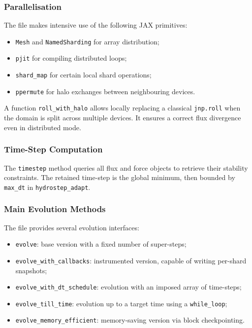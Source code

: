 \documentclass[a4paper, 11pt]{article}
\begin{document}
\subsubsection*{Parallelisation}
The file makes intensive use of the following JAX primitives:
\begin{itemize}
    \item \texttt{Mesh} and \texttt{NamedSharding} for array distribution;
    \item \texttt{pjit} for compiling distributed loops;
    \item \texttt{shard\_map} for certain local shard operations;
    \item \texttt{ppermute} for halo exchanges between neighbouring devices.
\end{itemize}

A function \texttt{roll\_with\_halo} allows locally replacing a classical \texttt{jnp.roll} when the domain is split across multiple devices. It ensures a correct flux divergence even in distributed mode.

\subsubsection*{Time-Step Computation}
The \texttt{timestep} method queries all flux and force objects to retrieve their stability constraints. The retained time-step is the global minimum, then bounded by \texttt{max\_dt} in \texttt{hydrostep\_adapt}.

\subsubsection*{Main Evolution Methods}
The file provides several evolution interfaces:
\begin{itemize}
    \item \texttt{evolve}: base version with a fixed number of super-steps;
    \item \texttt{evolve\_with\_callbacks}: instrumented version, capable of writing per-shard snapshots;
    \item \texttt{evolve\_with\_dt\_schedule}: evolution with an imposed array of time-steps;
    \item \texttt{evolve\_till\_time}: evolution up to a target time using a \texttt{while\_loop};
    \item \texttt{evolve\_memory\_efficient}: memory-saving version via block checkpointing.
\end{itemize}
\end{document}
